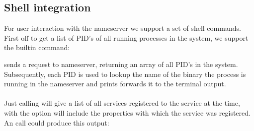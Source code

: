 \subsection{Shell integration}

For user interaction with the nameserver we support a set of shell commands. First off to get a list of PID's of all running processes in the system, we support the builtin command:
\newline

\begin{mdframed}[style=shell]
\end{mdframed}
\newline


 sends a request to nameserver, returning an array of all PID's in the system. Subsequently, each PID is used to lookup the name of the binary the process is running in the nameserver and prints forwards it to the terminal output.
\paragraph{}

\begin{mdframed}[style=shell]
\end{mdframed}
\paragraph{}


Just calling  will give a list of all services registered to the service at the time, with the  option will include the properties with which the service was registered. An  call could produce this output:
\newline

\begin{mdframed}[style=shell]

\color{black}
\end{mdframed}
